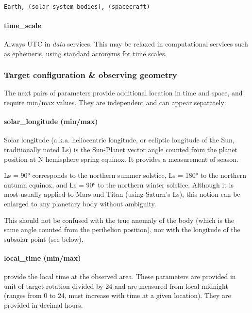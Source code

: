 \documentclass[11pt,a4paper]{ivoa}
\begin{document}
\begin{verbatim}

Earth, (solar system bodies), (spacecraft)

\end{verbatim}

\paragraph{time\_scale}

Always UTC in \emph{data} services. This may be relaxed in computational services such as ephemeris, using standard acronyms for time scales.

\subsubsection{Target configuration \& observing geometry}

The next pairs of parameters provide additional location in time and space, and require min/max values. They are independent and can appear separately:

\paragraph{solar\_longitude (min/max)}

Solar longitude (a.k.a. heliocentric longitude, or ecliptic longitude of the Sun, traditionally noted Ls) is the Sun-Planet vector angle counted from the planet position at N hemisphere spring equinox. It provides a measurement of season.

Ls = 90° corresponds to the northern summer solstice, Ls = 180° to the northern autumn equinox, and Ls = 90° to the northern winter solstice. Although it is most usually applied to Mars and Titan (using Saturn's Ls), this notion can be enlarged to any planetary body without ambiguity.

This should not be confused with the true anomaly of the body (which is the same angle counted from the perihelion position), nor with the longitude of the subsolar point (see below).

\paragraph{local\_time (min/max)}

provide the local time at the observed area. These parameters are provided in unit of target rotation divided by 24 and are measured from local midnight (ranges from 0 to 24, must increase with time at a given location). They are provided in decimal hours.
\end{document}

